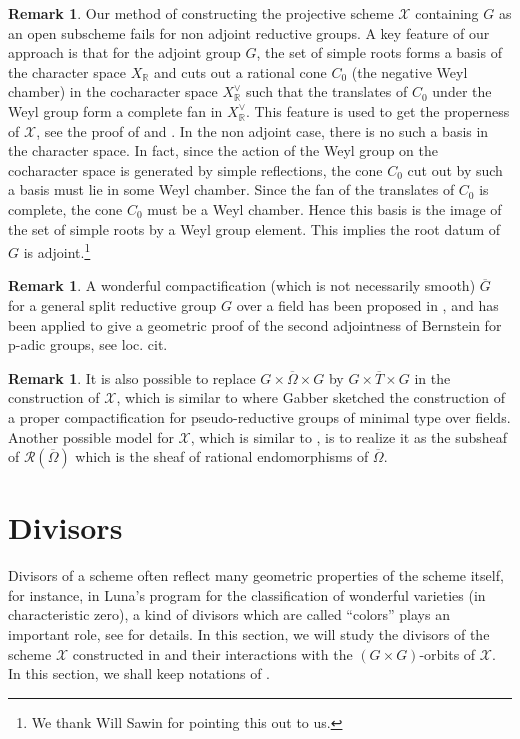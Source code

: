 \documentclass[11pt, reqno]{amsart}
\theoremstyle{plain}
\theoremstyle{definition}
\newtheorem{remark}[theorem]{Remark}
\begin{document}
\begin{remark}
    Our method of constructing the projective scheme $\mathcal{X}$ containing $G$ as an open subscheme fails for non adjoint reductive groups. A key feature of our approach is that for the adjoint group $G$, the set of simple roots forms a basis of the character space $X_{\mathbb{R}}$ and cuts out a rational cone $C_0$ (the negative Weyl chamber) in the cocharacter space $X^{\vee}_{\mathbb{R}}$ such that the translates of $C_0$ under the Weyl group form a complete fan in $X^{\vee}_{\mathbb{R}}$. This feature is used to get the properness of $\mathcal{X}$, see the proof of  and . In the non adjoint case, there is no such a basis in the character space. In fact, since the action of the Weyl group on the cocharacter space is generated by simple reflections, the cone $C_0$ cut out by such a basis must lie in some Weyl chamber. Since the fan of the translates of $C_0$ is complete, the cone $C_0$ must be a Weyl chamber. Hence this basis is the image of the set of simple roots by a Weyl group element. This implies the root datum of $G$ is adjoint.\footnote{We thank Will Sawin for pointing this out to us.}
\end{remark}


\begin{remark}
    A wonderful compactification (which is not necessarily smooth) $\overline{G}$ for a general split reductive group $G$ over a field has been proposed in \cite[2.4]{secondadjointness}, and has been applied to give a geometric proof of the second adjointness of Bernstein for p-adic groups, see loc. cit.
\end{remark}

\begin{remark}   
    It is also possible to replace $G\times\overline{\Omega}\times G$ by $G\times\overline{T}\times G$ in the construction of $\mathcal{X}$, which is similar to \cite{gabbercompactreport} where Gabber sketched the construction of a proper compactification for pseudo-reductive groups of minimal type over fields. Another possible model for $\mathcal{X}$, which is similar to \cite[Chapter~5]{BLR}, is to realize it as the subsheaf of $\mathcal{R}(\overline{\Omega})$ which is the sheaf of rational endomorphisms of $\overline{\Omega}$. 
\end{remark}



\section{Divisors}\label{sectiondivisors}
Divisors of a scheme often reflect many geometric properties of the scheme itself, for instance, in Luna's program for the classification of wonderful varieties (in characteristic zero), a kind of divisors which are called ``colors'' plays an important role, see \cite{Lunavarietespherique} for details. In this section, we will study the divisors of the scheme $\mathcal{X}$ constructed in  and their interactions with the $(G\times G)$-orbits of $\mathcal{X}$. In this section, we shall keep notations of . 
\end{document}
